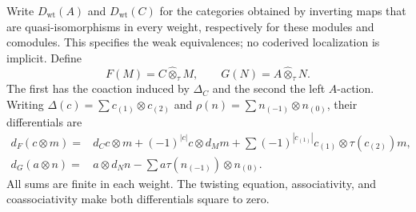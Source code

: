Write $D_{\mathrm{wt}}(A)$ and $D_{\mathrm{wt}}(C)$ for the categories
obtained by inverting maps that are quasi-isomorphisms in every weight,
respectively for these modules and comodules.
This specifies the weak equivalences; no coderived localization is implicit.
Define
\[
 F(M)=C\widehat\otimes_\tau M,\qquad
 G(N)=A\widehat\otimes_\tau N.
\]
The first has the coaction induced by $\Delta_C$ and the second the left $A$-action.
Writing $\Delta(c)=\sum c_{(1)}\otimes c_{(2)}$ and
$\rho(n)=\sum n_{(-1)}\otimes n_{(0)}$, their differentials are
\[
\begin{aligned}
 d_F(c\otimes m)={}&d_Cc\otimes m+(-1)^{|c|}c\otimes d_Mm
  +\sum(-1)^{|c_{(1)}|}c_{(1)}\otimes\tau(c_{(2)})m,\\
 d_G(a\otimes n)={}&a\otimes d_Nn
  -\sum a\tau(n_{(-1)})\otimes n_{(0)}.
\end{aligned}
\]
All sums are finite in each weight.
The twisting equation, associativity, and coassociativity make both differentials square to zero.

